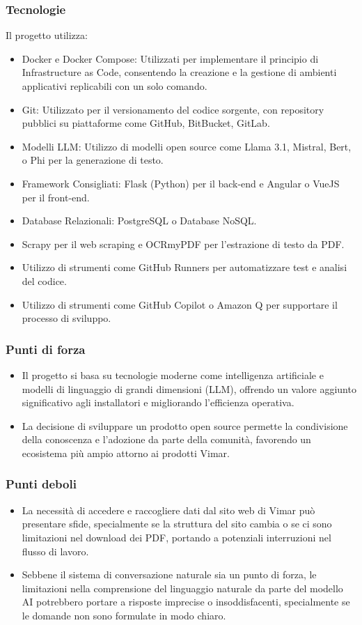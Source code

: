 \subsubsection{Tecnologie}
    Il progetto utilizza:

\begin{itemize}
    \item Docker e Docker Compose: Utilizzati per implementare il principio di Infrastructure as Code, consentendo la creazione e la gestione di ambienti applicativi replicabili con un solo comando.
    \item Git: Utilizzato per il versionamento del codice sorgente, con repository pubblici su piattaforme come GitHub, BitBucket, GitLab.
    \item Modelli LLM: Utilizzo di modelli open source come Llama 3.1, Mistral, Bert, o Phi per la generazione di testo.
    \item Framework Consigliati: Flask (Python) per il back-end e Angular o VueJS per il front-end.
    \item Database Relazionali: PostgreSQL o Database NoSQL.
    \item  Scrapy per il web scraping e OCRmyPDF per l'estrazione di testo da PDF.
    \item Utilizzo di strumenti come GitHub Runners per automatizzare test e analisi del codice.
    \item  Utilizzo di strumenti come GitHub Copilot o Amazon Q per supportare il processo di sviluppo.
\end{itemize}
    \subsubsection{Punti di forza}
    \begin{itemize}
    \item Il progetto si basa su tecnologie moderne come intelligenza artificiale e modelli di linguaggio di grandi dimensioni (LLM), offrendo un valore aggiunto significativo agli installatori e migliorando l'efficienza operativa.
    \item La decisione di sviluppare un prodotto open source permette la condivisione della conoscenza e l'adozione da parte della comunità, favorendo un ecosistema più ampio attorno ai prodotti Vimar.
\end{itemize}
    \subsubsection{Punti deboli}
    \begin{itemize}
    \item La necessità di accedere e raccogliere dati dal sito web di Vimar può presentare sfide, specialmente se la struttura del sito cambia o se ci sono limitazioni nel download dei PDF, portando a potenziali interruzioni nel flusso di lavoro.
    \item Sebbene il sistema di conversazione naturale sia un punto di forza, le limitazioni nella comprensione del linguaggio naturale da parte del modello AI potrebbero portare a risposte imprecise o insoddisfacenti, specialmente se le domande non sono formulate in modo chiaro. 
\end{itemize}

